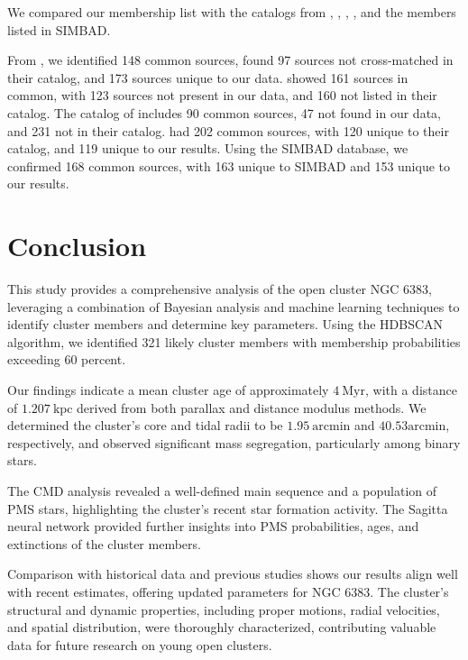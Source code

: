 \documentclass[fleqn,usenatbib,usedcolumn,useAMS]{mnras}
\begin{document}
We compared our membership list with the catalogs from \citet{2020AA...640A...1C}, \citet{2021ApJ...923..129J}, \citet{2022ApJS..262....7H}, \citet{2024arXiv240305143H}, and the members listed in SIMBAD.

From \citet{2020AA...640A...1C}, we identified 148 common sources, found 97 sources not cross-matched in their catalog, and 173 sources unique to our data. \citet{2021ApJ...923..129J} showed 161 sources in common, with 123 sources not present in our data, and 160 not listed in their catalog. The catalog of \citet{2022ApJS..262....7H} includes 90 common sources, 47 not found in our data, and 231 not in their catalog. \citet{2024arXiv240305143H} had 202 common sources, with 120 unique to their catalog, and 119 unique to our results. Using the SIMBAD database, we confirmed 168 common sources, with 163 unique to SIMBAD and 153 unique to our results.

\section{Conclusion}

This study provides a comprehensive analysis of the open cluster NGC 6383, leveraging a combination of Bayesian analysis and machine learning techniques to identify cluster members and determine key parameters. Using the HDBSCAN algorithm, we identified 321 likely cluster members with membership probabilities exceeding 60 percent.

Our findings indicate a mean cluster age of approximately $4~\mathrm{Myr}$, with a distance of $1.207~\mathrm{kpc}$ derived from both parallax and distance modulus methods. We determined the cluster's core and tidal radii to be $1.95~\mathrm{arcmin}$ and $40.53 \mathrm{arcmin}$, respectively, and observed significant mass segregation, particularly among binary stars.

The CMD analysis revealed a well-defined main sequence and a population of PMS stars, highlighting the cluster's recent star formation activity. The Sagitta neural network provided further insights into PMS probabilities, ages, and extinctions of the cluster members.

Comparison with historical data and previous studies shows our results align well with recent estimates, offering updated parameters for NGC 6383. The cluster's structural and dynamic properties, including proper motions, radial velocities, and spatial distribution, were thoroughly characterized, contributing valuable data for future research on young open clusters.
\end{document}
